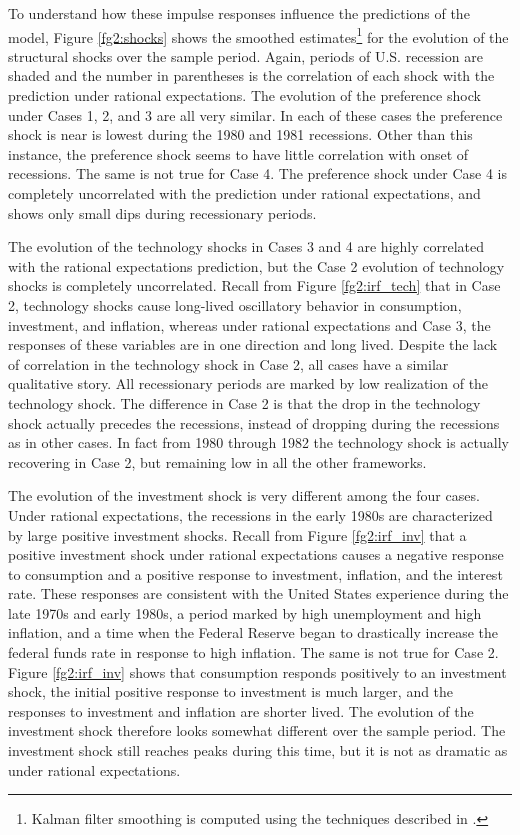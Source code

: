 {To understand how these impulse responses influence the predictions of the model, Figure \ref{fg2:shocks} shows the smoothed estimates\footnote{Kalman filter smoothing is computed using the techniques described in .} for the evolution of the structural shocks over the sample period.  Again, periods of U.S. recession are shaded and the number in parentheses is the correlation of each shock with the prediction under rational expectations.  The evolution of the preference shock under Cases 1, 2, and 3 are all very similar.  In each of these cases the preference shock is near is lowest during the 1980 and 1981 recessions.  Other than this instance, the preference shock seems to have little correlation with onset of recessions.  The same is not true for Case 4.  The preference shock under Case 4 is completely uncorrelated with the prediction under rational expectations, and shows only small dips during recessionary periods.

The evolution of the technology shocks in Cases 3 and 4 are highly correlated with the rational expectations prediction, but the Case 2 evolution of technology shocks is completely uncorrelated.  Recall from Figure \ref{fg2:irf_tech} that in Case 2, technology shocks cause long-lived oscillatory behavior in consumption, investment, and inflation, whereas under rational expectations and Case 3, the responses of these variables are in one direction and long lived.  Despite the lack of correlation in the technology shock in Case 2, all cases have a similar qualitative story.  All recessionary periods are marked by low realization of the technology shock.  The difference in Case 2 is that the drop in the technology shock actually precedes the recessions, instead of dropping during the recessions as in other cases.  In fact from 1980 through 1982 the technology shock is actually recovering in Case 2, but remaining low in all the other frameworks.

The evolution of the investment shock is very different among the four cases.  Under rational expectations, the recessions in the early 1980s are characterized by large positive investment shocks.  Recall from Figure \ref{fg2:irf_inv} that a positive investment shock under rational expectations causes a negative response to consumption and a positive response to investment, inflation, and the interest rate.  These responses are consistent with the United States experience during the late 1970s and early 1980s, a period marked by high unemployment and high inflation, and a time when the Federal Reserve began to drastically increase the federal funds rate in response to high inflation.  The same is not true for Case 2.  Figure \ref{fg2:irf_inv} shows that consumption responds positively to an investment shock, the initial positive response to investment is much larger, and the responses to investment and inflation are shorter lived.  The evolution of the investment shock therefore looks somewhat different over the sample period.  The investment shock still reaches peaks during this time, but it is not as dramatic as under rational expectations.  

}
